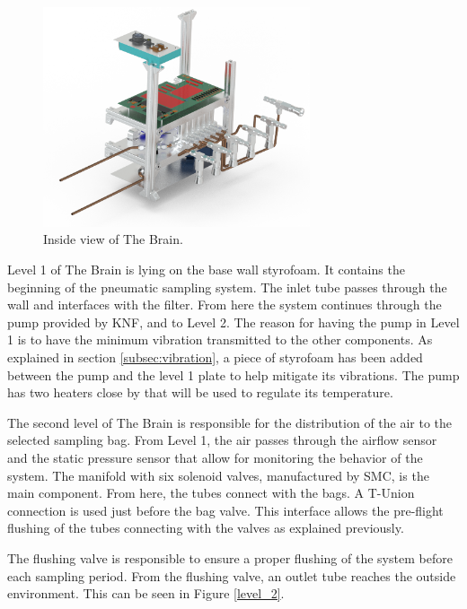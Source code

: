 \begin{figure}[H]
    \centering
    \includegraphics[width=0.7\textwidth]{4-experiment-design/img/Mechanical/Figure_23.png}
    \caption{Inside view of The Brain.}
    \label{brain_isometric_open}
\end{figure}
Level 1 of The Brain is lying on the base wall styrofoam. It contains the beginning of the pneumatic sampling system. The inlet tube passes through the wall and interfaces with the filter. From here the system continues through the pump provided by KNF, and to Level 2. The reason for having the pump in Level 1 is to have the minimum vibration transmitted to the other components. As explained in section \ref{subsec:vibration}, a piece of styrofoam has been added between the pump and the level 1 plate to help mitigate its vibrations. The pump has two heaters close by that will be used to regulate its temperature. %

The second level of The Brain is responsible for the distribution of the air to the selected sampling bag. From Level 1, the air passes through the airflow sensor and the static pressure sensor that allow for monitoring the behavior of the system. The manifold with six solenoid valves, manufactured by SMC, is the main component. From here, the tubes connect with the bags. A T-Union connection is used just before the bag valve. This interface allows the pre-flight flushing of the tubes connecting with the valves as explained previously. 

\smallskip
The flushing valve is responsible to ensure a proper flushing of the system before each sampling period. From the flushing valve, an outlet tube reaches the outside environment. This can be seen in Figure \ref{level_2}.

